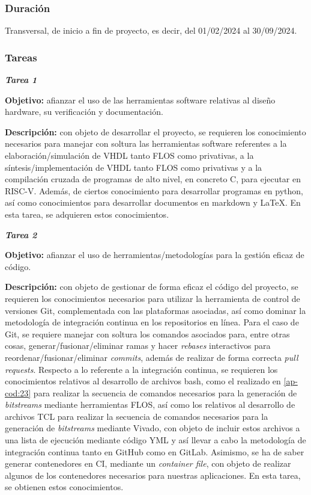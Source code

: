\subsubsection{Duración}

Transversal, de inicio a fin de proyecto, es decir, del 01/02/2024 al 30/09/2024.

\subsubsection{Tareas}

\noindent \textbf{\textit{Tarea 1}}

\textbf{Objetivo:} afianzar el uso de las herramientas software relativas al diseño hardware, su verificación y documentación. 

\textbf{Descripción:} con objeto de desarrollar el proyecto, se requieren los conocimiento necesarios para manejar con soltura las herramientas software referentes a la elaboración/simulación de VHDL tanto FLOS como privativas, a la síntesis/implementación de VHDL tanto FLOS como privativas y a la compilación cruzada de programas de alto nivel, en concreto C, para ejecutar en RISC-V. 
Además, de ciertos conocimiento para desarrollar programas en python, así como conocimientos para desarrollar documentos en markdown y \LaTeX.
En esta tarea, se adquieren estos conocimientos.


\noindent \textbf{\textit{Tarea 2}}

\textbf{Objetivo:} afianzar el uso de herramientas/metodologías para la gestión eficaz de código. 

\textbf{Descripción:} con objeto de gestionar de forma eficaz el código del proyecto, se requieren los conocimientos necesarios para utilizar la herramienta de control de versiones Git, complementada con las plataformas asociadas, así como dominar la metodología de integración continua en los repositorios en línea.
Para el caso de Git, se requiere manejar con soltura los comandos asociados para, entre otras cosas, generar/fusionar/eliminar ramas y hacer \textit{rebases} interactivos para reordenar/fusionar/eliminar \textit{commits}, además de realizar de forma correcta \textit{pull requests}.
Respecto a lo referente a la integración continua, se requieren los conocimientos relativos al desarrollo de archivos bash, como el realizado en \ref{ap-cod:23} para realizar la secuencia de comandos necesarios para la generación de \textit{bitstreams} mediante herramientas FLOS, así como los relativos al desarrollo de archivos TCL para realizar la secuencia de comandos necesarios para la generación de \textit{bitstreams} mediante Vivado, con objeto de incluir estos archivos a una lista de ejecución mediante código YML y así llevar a cabo la metodología de integración continua tanto en GitHub como en GitLab.
Asimismo, se ha de saber generar contenedores en CI, mediante un \textit{container file}, con objeto de realizar algunos de los contenedores necesarios para nuestras aplicaciones. 
En esta tarea, se obtienen estos conocimientos.

